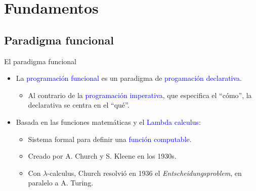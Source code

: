 \documentclass{beamer} %
\newcommand{\blue}[1]{\textcolor{blue}{#1}}
\begin{document}

\section{Fundamentos}

\subsection{Paradigma funcional}

\begin{frame}{El paradigma funcional}
  \begin{itemize}
    \item La \blue{programación funcional} es un paradigma de \blue{progamación declarativa}.
    \begin{itemize}
        \item Al contrario de la \blue{programación imperativa}, que especifica el ``cómo'', la declarativa se centra en el ``qué''.
    \end{itemize}
    \item Basada en las funciones matemáticas y el \blue{Lambda calculus}:
    \begin{itemize}
        \item Sistema formal para definir una \blue{función computable}.
        \item Creado por A. Church y S. Kleene en los 1930s.
        \item Con $\lambda$-calculus, Church resolvió en 1936 el {\em Entscheidungsproblem}, en paralelo a A. Turing.
    \end{itemize}
  \end{itemize}
\end{frame}
\end{document}
